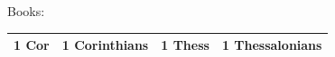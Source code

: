 \documentclass[10pt]{article}
\begin{document}
\begin{center}
\vspace{1em}
Books: \begin{tabular}{|l|l|l|l|} \hline
1 Cor & 1 Corinthians &
1 Thess & 1 Thessalonians \\
   \hline
\end{tabular}
\end{center}
\end{document}
